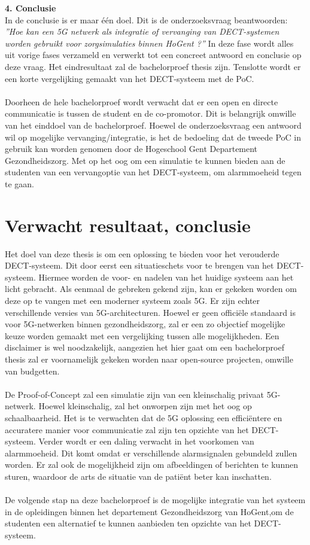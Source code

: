 \textbf{4. Conclusie}\\
In de conclusie is er maar één doel. Dit is de onderzoeksvraag beantwoorden: \textit{''Hoe kan een 5G netwerk als integratie of vervanging van DECT-systemen worden gebruikt voor zorgsimulaties binnen HoGent ?''} In deze fase wordt alles uit vorige fases verzameld en verwerkt tot een concreet antwoord en conclusie op deze vraag. Het eindresultaat zal de bachelorproef thesis zijn. Tenslotte wordt er een korte vergelijking gemaakt van het DECT-systeem met de PoC.
\\\\
Doorheen de hele bachelorproef wordt verwacht dat er een open en directe communicatie is tussen de student en de co-promotor. Dit is belangrijk omwille van het einddoel van de bachelorproef. Hoewel de onderzoeksvraag een antwoord wil op mogelijke vervanging/integratie, is het de bedoeling dat de tweede PoC in gebruik kan worden genomen door de Hogeschool Gent Departement Gezondheidszorg. Met op het oog om een simulatie te kunnen bieden aan de studenten van een vervangoptie van het DECT-systeem, om alarmmoeheid tegen te gaan.

\section{Verwacht resultaat, conclusie}%
\label{sec:verwachte_resultaten}

Het doel van deze thesis is om een oplossing te bieden voor het verouderde DECT-systeem. Dit door eerst een situatieschets voor te brengen van het DECT-systeem. Hiermee worden de voor- en nadelen van het huidige systeem aan het licht gebracht. Als eenmaal de gebreken gekend zijn, kan er gekeken worden om deze op te vangen met een moderner systeem zoals 5G. Er zijn echter verschillende versies van 5G-architecturen. Hoewel er geen officiële standaard is voor 5G-netwerken binnen gezondheidszorg, zal er een zo objectief mogelijke keuze worden gemaakt met een vergelijking tussen alle mogelijkheden. Een disclaimer is wel noodzakelijk, aangezien het hier gaat om een bachelorproef thesis zal er voornamelijk gekeken worden naar open-source projecten, omwille van budgetten. \\\\
De Proof-of-Concept zal een simulatie zijn van een kleinschalig privaat 5G-netwerk. Hoewel kleinschalig, zal het onworpen zijn met het oog op schaalbaarheid. Het is te verwachten dat de 5G oplossing een efficiëntere en accuratere manier voor communicatie zal zijn ten opzichte van het DECT-systeem. Verder wordt er een daling verwacht in het voorkomen van alarmmoeheid. Dit komt omdat er verschillende alarmsignalen gebundeld zullen worden. Er zal ook de mogelijkheid zijn om afbeeldingen of berichten te kunnen sturen, waardoor de arts de situatie van de patiënt beter kan inschatten.\\\\
De volgende stap na deze bachelorproef is de mogelijke integratie van het systeem in de opleidingen binnen het departement Gezondheidszorg van HoGent,om de studenten een alternatief te kunnen aanbieden ten opzichte van het DECT-systeem.